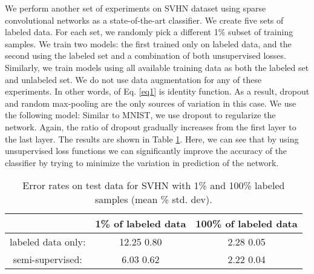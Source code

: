 \documentclass{article}
\begin{document}
We perform another set of experiments on SVHN dataset using sparse convolutional networks as a state-of-the-art classifier. We create five sets of labeled data. For each set, we randomly pick a different 1\% subset of training samples. We train two models: the first trained only on labeled data, and the second using the labeled set and a combination of both unsupervised losses. Similarly, we train models using all available training data as both the labeled set and unlabeled set. We do not use data augmentation for any of these experiments. In other words,  of Eq. \ref{eq1} is identity function. As a result, dropout and random max-pooling are the only sources of variation in this case. We use the following model:  Similar to MNIST, we use dropout to regularize the network. Again, the ratio of dropout gradually increases from the first layer to the last layer. The results are shown in Table \ref{tab3}. Here, we can see that by using unsupervised loss functions we can significantly improve the accuracy of the classifier by trying to minimize the variation in prediction of the network.
\begin{table}[h]
  \caption{Error rates on test data for SVHN with 1\% and 100\% labeled samples (mean \%  std. dev).}
  \begin{center}
  \begin{tabular}{ c  c  c }
 \rule[-1.2ex]{0pt}{0ex}		         &  1\% of labeled data & 100\% of labeled data \\ \hline     
 \rule{0pt}{3ex}     labeled data only:  &  12.25  0.80 &  2.28  0.05   \\
                      semi-supervised:   &  6.03   0.62 &  2.22  0.04   \\              
  \end{tabular}  
  \end{center}
  \label{tab3}
\end{table}
\vspace{-0.5cm}
\end{document}
